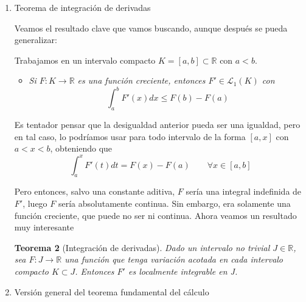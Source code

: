 \documentclass[a4paper, 12pt]{article}
\newtheorem*{teorema*}{Teorema}
\begin{document}
\begin{enumerate}[label=\textbf{\arabic*}.]
\begin{enumerate}[label=\textit{\alph*)}]
		Tras realizar una serie de observaciones y probar varios resultados, podemos obtener lo que se puede entender como una primera parte del Teorema Fundamental del Cálculo:
		
		\begin{teorema*}[Derivación de integrales]
		Dado un intervalo no trivial \(J \subset \mathbb{R}\), sea \(F : J \to \mathbb{R}\) cualquier integral indefinida de una función \(f \in \mathcal{L}_1^{\text{loc}} (J)\). Entonces F es derivable c.p.d en J con \(F'(x) = f(x)\) p.c.t \(x \in J\).
		\end{teorema*}
		
		\item Teorema de integración de derivadas
		
		Veamos el resultado clave que vamos buscando, aunque después se pueda generalizar:
		
		
		Trabajamos en un intervalo compacto \(K = [a,b] \subset \mathbb{R}\) con \(a < b\).
		\begin{itemize}
				
		
			\item \textit{Si \(F:K \to \mathbb{R}\) es una función creciente, entonces \(F' \in \mathcal{L}_1 (K)\) con} 
			\begin{equation}\label{quince}
				\int_a^b F'(x) dx \leq F(b) - F(a)	
			\end{equation}
		\end{itemize}
		
		Es tentador pensar que la desigualdad anterior pueda ser una igualdad, pero en tal caso, lo podríamos usar para todo intervalo de la forma \([a,x]\) con \(a<x<b\), obteniendo que
		\[
			\int_a^x F'(t) dt = F(x) - F(a) \qquad \forall x \in [a,b]
		\]
		
		Pero entonces, salvo una constante aditiva, \(F\) sería una integral indefinida de \(F'\), luego \(F\) sería absolutamente continua. Sin embargo, era solamente una función creciente, que puede no ser ni continua. Ahora veamos un resultado muy interesante
		
		\begin{teorema*}[Integración de derivadas]
		Dado un intervalo no trivial \(J \in \mathbb{R}\), sea \(F: J \to \mathbb{R}\) una función que tenga variación acotada en cada intervalo compacto \(K \subset J\). Entonces \(F'\) es localmente integrable en J.		
		\end{teorema*}
		
		\item Versión general del teorema fundamental del cálculo
		

\end{enumerate}
\end{enumerate}
\end{document}
